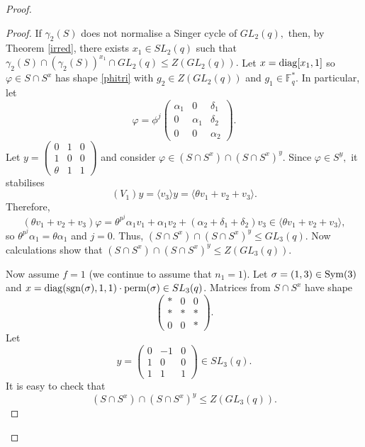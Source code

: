 \begin{proof}
\begin{proof}
If $\gamma_2(S)$ does not normalise a Singer cycle of $GL_2(q),$ then, by Theorem \ref{irred}, 
   there exists $x_1 \in SL_2(q)$ such that $\gamma_2(S) \cap (\gamma_2(S))^{x_1} \cap GL_2(q) \le Z(GL_2(q)).$ Let $x=\mathrm{diag}[x_1,1]$ so $\varphi \in S \cap S^x$ has shape \eqref{phitri} with $g_2 \in Z(GL_2(q))$ and $g_1 \in \mathbb{F}_q^*.$ In particular, let 
$$
\varphi =\phi^j
\begin{pmatrix}
\alpha_1 & 0 & \delta_1\\
 0&     \alpha_1 & \delta_2\\
0 & 0& \alpha_2  
\end{pmatrix}.
$$
 Let $y=
\begin{pmatrix}
0&1&0\\
1&0&0\\
\theta&1&1
\end{pmatrix}$ and consider $\varphi \in (S \cap S^x) \cap (S \cap S^x)^y.$ Since $\varphi \in S^y,$ it stabilises $$(V_1)y=\langle v_3 \rangle y= \langle \theta v_1 +v_2 +v_3 \rangle.$$ Therefore,
$$(\theta v_1 +v_2 +v_3)\varphi = \theta^{p^j} \alpha_1 v_1 + \alpha_1 v_2 + (\alpha_2 +\delta_1 +\delta_2)v_3 \in \langle \theta v_1 +v_2 +v_3 \rangle,$$
so $\theta^{p^j} \alpha_1= \theta \alpha_1$ and $j=0$. Thus, $(S \cap S^x) \cap (S \cap S^x)^y \le GL_3(q).$ Now calculations  show that $(S \cap S^x) \cap (S \cap S^x)^y \le Z(GL_3(q)).$

Now assume $f=1$ (we  continue to assume that $n_1=1$). Let $\sigma=(1,3) \in \mathrm{Sym}(3)$ and $x=\mathrm{diag}(\mathrm{sgn}(\sigma),1,1) \cdot {\rm perm}(\sigma) \in SL_3(q)$. Matrices from $S \cap S^x$ have shape  
  \begin{equation*} 
  \begin{pmatrix}
*    & 0 & 0  \\
* &*    & *  \\
  0&    0    &   *      
\end{pmatrix}.
\end{equation*}
Let   
  \begin{equation*} 
y=  \begin{pmatrix}
0    & -1 & 0  \\
1 &0    & 0  \\
  1&    1    &   1      
\end{pmatrix} \in SL_3(q).
\end{equation*}
It is easy to check that $$(S\cap S^x) \cap (S\cap S^x)^y \le Z(GL_3(q)).$$


\end{proof}
\end{proof}
